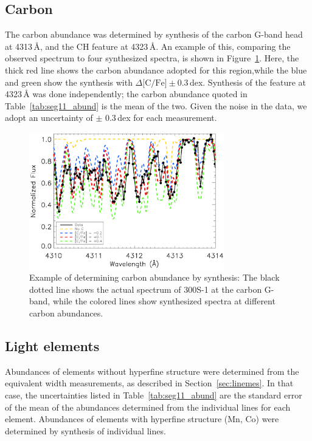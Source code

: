 \documentclass{emulateapj}
\begin{document}
\subsection{Carbon}
The carbon abundance was determined by synthesis of the carbon G-band
head at 4313\,{\AA}, and the CH feature at 4323\,{\AA}. An example of
this, comparing the observed spectrum to four synthesized spectra, is
shown in Figure~\ref{fig:gband}. Here, the thick red line shows the
carbon abundance adopted for this region,while the blue and green show
the synthesis with $\Delta \mbox{[C/Fe]} \pm 0.3$\,dex. Synthesis of
the feature at 4323\,{\AA} was done independently; the carbon
abundance quoted in Table~\ref{tab:seg11_abund} is the mean of the
two. Given the noise in the data, we adopt an uncertainty of $\pm$
0.3\,dex for each measurement.

\begin{figure}
 \begin{center}
  \includegraphics[width=8.5cm,clip=true,bbllx=80, bblly=362,bburx=550, bbury=705]{CH_synth.ps}
  \caption{Example of determining carbon abundance by synthesis: The
    black dotted line shows the actual spectrum of 300S-1 at the
    carbon G-band, while the colored lines show synthesized spectra at
    different carbon abundances. }
  \label{fig:gband}
 \end{center}
\end{figure} 
  



\subsection{Light elements}
Abundances of elements without hyperfine structure were determined
from the equivalent width measurements, as described in
Section~\ref{sec:linemes}. In that case, the uncertainties listed in
Table~\ref{tab:seg11_abund} are the standard error of the mean of the
abundances determined from the individual lines for each
element. Abundances of elements with hyperfine structure (Mn, Co) were
determined by synthesis of individual lines.
\end{document}
